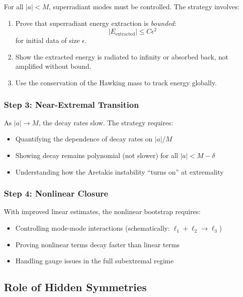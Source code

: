 \documentclass[12pt,a4paper]{article}
\begin{document}
For all $|a| < M$, superradiant modes must be controlled. The strategy involves:
\begin{enumerate}
    \item Prove that superradiant energy extraction is \textit{bounded}:
    \begin{equation}
    |E_{\text{extracted}}| \leq C \epsilon^2
    \end{equation}
    for initial data of size $\epsilon$.
    
    \item Show the extracted energy is radiated to infinity or absorbed back, not amplified without bound.
    
    \item Use the conservation of the Hawking mass to track energy globally.
\end{enumerate}

\subsubsection{Step 3: Near-Extremal Transition}

As $|a| \to M$, the decay rates slow. The strategy requires:
\begin{itemize}
    \item Quantifying the dependence of decay rates on $|a|/M$
    \item Showing decay remains polynomial (not slower) for all $|a| < M - \delta$
    \item Understanding how the Aretakis instability ``turns on'' at extremality
\end{itemize}

\subsubsection{Step 4: Nonlinear Closure}

With improved linear estimates, the nonlinear bootstrap requires:
\begin{itemize}
    \item Controlling mode-mode interactions (schematically: $\ell_1 + \ell_2 \to \ell_3$)
    \item Proving nonlinear terms decay faster than linear terms
    \item Handling gauge issues in the full subextremal regime
\end{itemize}

\subsection{Role of Hidden Symmetries}
\end{document}
